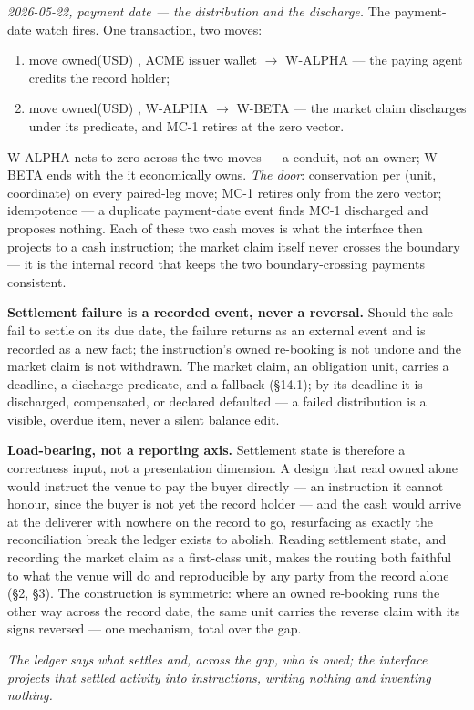 \emph{2026-05-22, payment date --- the distribution and the discharge.} The
payment-date watch fires. One transaction, two moves:
\begin{enumerate}[label=(\arabic*),nosep]
\item move owned(USD) , ACME issuer wallet $\to$ W-ALPHA --- the paying
agent credits the record holder;
\item move owned(USD) , W-ALPHA $\to$ W-BETA --- the market claim
discharges under its predicate, and MC-1 retires at the zero vector.
\end{enumerate}
W-ALPHA nets to zero across the two moves --- a conduit, not an owner; W-BETA ends
with the  it economically owns. \emph{The door}: conservation per
(unit, coordinate) on every paired-leg move; MC-1 retires only from the zero vector;
idempotence --- a duplicate payment-date event finds MC-1 discharged and proposes
nothing. Each of these two cash moves is what the interface then projects to a cash
instruction; the market claim itself never crosses the boundary --- it is the
internal record that keeps the two boundary-crossing payments consistent.

\medskip\noindent\textbf{Settlement failure is a recorded event, never a reversal.}
Should the sale fail to settle on its due date, the failure returns as an external
event and is recorded as a new fact; the instruction's owned re-booking is not undone
and the market claim is not withdrawn. The market claim, an obligation unit, carries
a deadline, a discharge predicate, and a fallback (\S14.1); by its deadline it is
discharged, compensated, or declared defaulted --- a failed distribution is a
visible, overdue item, never a silent balance edit.

\medskip\noindent\textbf{Load-bearing, not a reporting axis.} Settlement state is
therefore a correctness input, not a presentation dimension. A design that read owned
alone would instruct the venue to pay the buyer directly --- an instruction it cannot
honour, since the buyer is not yet the record holder --- and the cash would arrive at
the deliverer with nowhere on the record to go, resurfacing as exactly the
reconciliation break the ledger exists to abolish. Reading settlement state, and
recording the market claim as a first-class unit, makes the routing both faithful to
what the venue will do and reproducible by any party from the record alone (\S2,
\S3). The construction is symmetric: where an owned re-booking runs the other way
across the record date, the same unit carries the reverse claim with its signs
reversed --- one mechanism, total over the gap.

\emph{The ledger says what settles and, across the gap, who is owed; the interface
projects that settled activity into instructions, writing nothing and inventing
nothing.}
